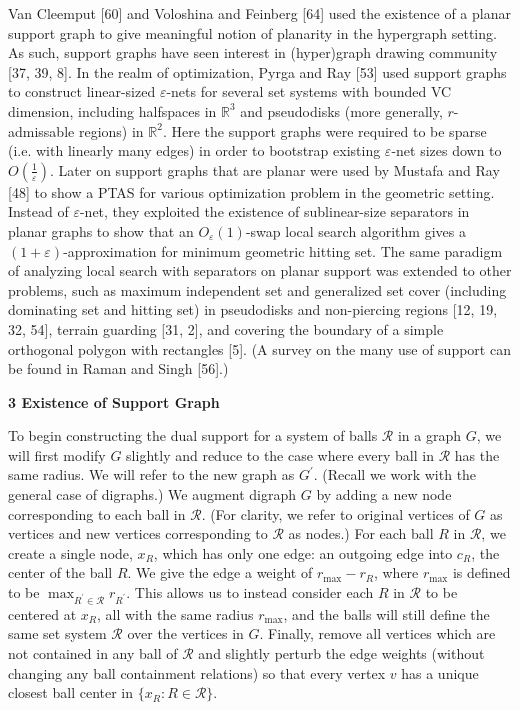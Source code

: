 Van Cleemput [60] and Voloshina and Feinberg [64] used the existence of a planar support graph to give meaningful notion of planarity in the hypergraph setting. As such, support graphs have seen interest in (hyper)graph drawing community [37, 39, 8]. In the realm of optimization, Pyrga and Ray [53] used support graphs to construct linear-sized $\varepsilon$-nets for several set systems with bounded VC dimension, including halfspaces in $\mathbb{R}^{3}$ and pseudodisks (more generally, $r$-admissable regions) in $\mathbb{R}^{2}$. Here the support graphs were required to be sparse (i.e. with linearly many edges) in order to bootstrap existing $\varepsilon$-net sizes down to $O(\frac{1}{\varepsilon})$. Later on support graphs that are planar were used by Mustafa and Ray [48] to show a PTAS for various optimization problem in the geometric setting. Instead of $\varepsilon$-net, they exploited the existence of sublinear-size separators in planar graphs to show that an $O_{\varepsilon}(1)$-swap local search algorithm gives a $(1+\varepsilon)$-approximation for minimum geometric hitting set. The same paradigm of analyzing local search with separators on planar support was extended to other problems, such as maximum independent set and generalized set cover (including dominating set and hitting set) in pseudodisks and non-piercing regions [12, 19, 32, 54], terrain guarding [31, 2], and covering the boundary of a simple orthogonal polygon with rectangles [5]. (A survey on the many use of support can be found in Raman and Singh [56].)
\par
\par
\par\medskip\noindent\textbf{3 Existence of Support Graph}\par
To begin constructing the dual support for a system of balls $\mathcal{R}$ in a graph $G$, we will first modify $G$ slightly and reduce to the case where every ball in $\mathcal{R}$ has the same radius. We will refer to the new graph as $G^{\prime}$. (Recall we work with the general case of digraphs.) We augment digraph $G$ by adding a new node corresponding to each ball in $\mathcal{R}$. (For clarity, we refer to original vertices of $G$ as vertices and new vertices corresponding to $\mathcal{R}$ as nodes.) For each ball $R$ in $\mathcal{R}$, we create a single node, $x_{R}$, which has only one edge: an outgoing edge into $c_{R}$, the center of the ball $R$. We give the edge a weight of $r_{\max}-r_{R}$, where $r_{\max}$ is defined to be $\max_{R^{\prime}\in\mathcal{R}}r_{R^{\prime}}$. This allows us to instead consider each $R$ in $\mathcal{R}$ to be centered at $x_{R}$, all with the same radius $r_{\max}$, and the balls will still define the same set system $\mathcal{R}$ over the vertices in $G$. Finally, remove all vertices which are not contained in any ball of $\mathcal{R}$ and slightly perturb the edge weights (without changing any ball containment relations) so that every vertex $v$ has a unique closest ball center in $\{x_{R}:R\in\mathcal{R}\}$.

